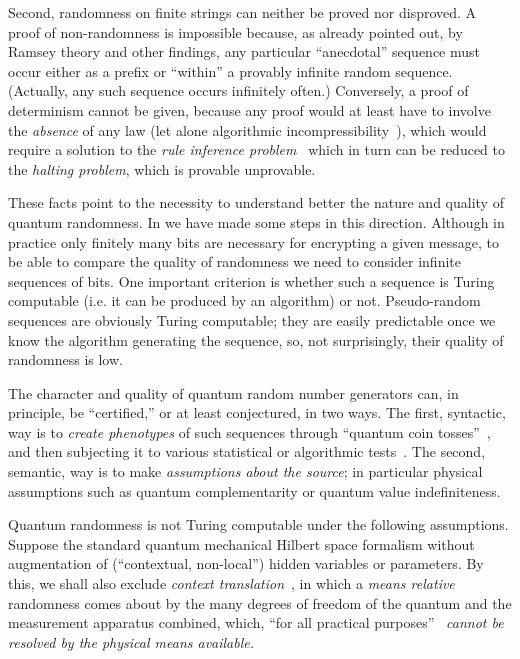 \documentclass[%
 preprint,
 showpacs,
 showkeys,
 preprintnumbers,
  amsmath,amssymb,
  aps,
 pra,
  longbibliography,
  floatfix,
 ]{revtex4-1}
\theoremstyle{plain}
\begin{document}
Second, randomness on finite strings can neither be proved nor disproved.
A proof of non-randomness is impossible because, as already pointed out, by Ramsey theory and other
findings, any particular ``anecdotal'' sequence must occur
either as a prefix or ``within'' a provably infinite random sequence.
(Actually, any such sequence occurs infinitely often.)
Conversely, a proof of determinism cannot be given, because any proof would at least have to involve
the {\em absence} of any law
(let alone algorithmic incompressibility~\cite{Cris2002}),
which would require a solution to the {\em rule inference problem}~\cite{angluin:83}
which in turn can be reduced to the {\em halting problem}, which is provable unprovable.

These facts point to the necessity to understand better the nature and quality of quantum randomness.
In \cite{CS,ACCS} we have made some steps in this direction.
Although in practice only finitely many bits are necessary for encrypting a given message,
to be able to compare the quality of randomness we need to consider infinite sequences of bits.
One important criterion is whether such a sequence is  Turing computable
(i.e.  it can be produced by an algorithm) or not.
Pseudo-random sequences are obviously Turing computable;
they are easily predictable once we know the algorithm generating the sequence, so,
not surprisingly, their quality of randomness is low.

The character and quality of quantum random number generators can, in principle, be ``certified,''
or at least conjectured, in two ways.
The first, syntactic, way is to {\em create phenotypes} of such sequences through ``quantum coin tosses''~\cite{svozil-qct,stefanov-2000,zeilinger:qct},
and then subjecting it to various statistical or algorithmic tests~\cite{2012-incomput-proofsCJ}.
The second, semantic, way is to make {\em assumptions about the source}; in particular physical assumptions such as
quantum complementarity or quantum value indefiniteness.


Quantum randomness is not Turing computable under the following assumptions.
Suppose the standard quantum mechanical Hilbert space formalism without augmentation of
(``contextual, non-local'') hidden variables or parameters.
By this, we shall also exclude {\em context translation}~\cite{svozil-2013-omelette},
in which a {\em means relative}~\cite{Myrvold2011237}
randomness comes about by the
many degrees of freedom of the quantum and the measurement apparatus combined,
which,  ``for all practical purposes''~\cite{bell-a} {\em cannot be resolved by the physical means available.}
\end{document}
